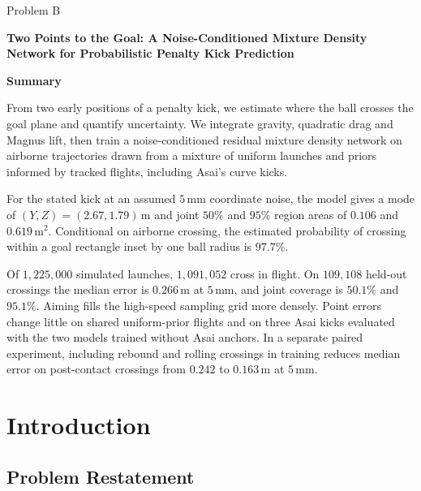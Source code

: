 \documentclass[11pt,a4paper]{article}
\newcommand{\problemletter}{B}
\newcommand{\papertitle}{Two Points to the Goal: A Noise-Conditioned Mixture Density Network for Probabilistic Penalty Kick Prediction}
\begin{document}
\thispagestyle{cover}
\begin{center}
  \vspace*{1.0cm}
  {\large Problem \problemletter\par}
  \vspace{1.2cm}
  {\LARGE\bfseries \papertitle\par}
  \vspace{1.2cm}
  {\large\bfseries Summary\par}
\end{center}
\vspace{0.2cm}


From two early positions of a penalty kick, we estimate where the ball crosses the goal plane and quantify uncertainty. We integrate gravity, quadratic drag and Magnus lift, then train a noise-conditioned residual mixture density network on airborne trajectories drawn from a mixture of uniform launches and priors informed by tracked flights, including Asai's curve kicks.

For the stated kick at an assumed $5\,\mathrm{mm}$ coordinate noise, the model gives a mode of $(Y,Z)=(2.67,1.79)\,\mathrm{m}$ and joint $50\%$ and $95\%$ region areas of $0.106$ and $0.619\,\mathrm{m^2}$. Conditional on airborne crossing, the estimated probability of crossing within a goal rectangle inset by one ball radius is $97.7\%$.

Of $1{,}225{,}000$ simulated launches, $1{,}091{,}052$ cross in flight. On $109{,}108$ held-out crossings the median error is $0.266\,\mathrm{m}$ at $5\,\mathrm{mm}$, and joint coverage is $50.1\%$ and $95.1\%$. Aiming fills the high-speed sampling grid more densely. Point errors change little on shared uniform-prior flights and on three Asai kicks evaluated with the two models trained without Asai anchors. In a separate paired experiment, including rebound and rolling crossings in training reduces median error on post-contact crossings from $0.242$ to $0.163\,\mathrm{m}$ at $5\,\mathrm{mm}$.

\clearpage
\tableofcontents
\clearpage

\section{Introduction}
\subsection{Problem Restatement}
\end{document}

